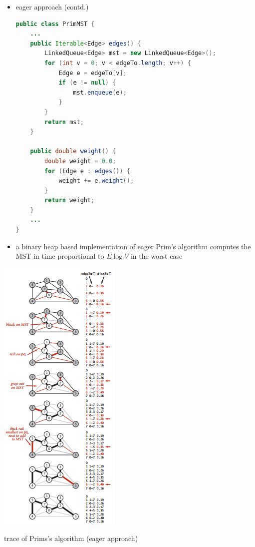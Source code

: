 \documentclass[8pt,a4paper,compress]{beamer}
\begin{document}
\begin{frame}[fragile]
\begin{minipage}{240pt}
\begin{itemize}
\item eager approach (contd.)

\begin{lstlisting}[language=Java]
public class PrimMST {
    ...
    public Iterable<Edge> edges() {
        LinkedQueue<Edge> mst = new LinkedQueue<Edge>();
        for (int v = 0; v < edgeTo.length; v++) {
            Edge e = edgeTo[v];
            if (e != null) { 
                mst.enqueue(e); 
            }
        }
        return mst;
    }

    public double weight() {
        double weight = 0.0;
        for (Edge e : edges()) { 
            weight += e.weight(); 
        }
        return weight;
    }
    ...
}
\end{lstlisting}

\item a binary heap based implementation of eager Prim's algorithm computes the MST in time proportional to $E \log V$ in the worst case
\end{itemize}
\end{minipage}%
\begin{minipage}{90pt}
\begin{center}
\includegraphics[scale=0.4]{./figures/mst6.png}

\smallskip

\tiny trace of Prims's algorithm (eager approach)
\end{center}
\end{minipage}
\end{frame}
\end{document}
